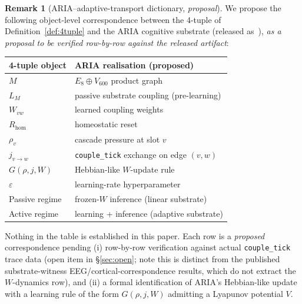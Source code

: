\documentclass[11pt]{article}
\theoremstyle{definition}
\newtheorem{remark}[theorem]{Remark}
\begin{document}
\begin{remark}[ARIA--adaptive-transport dictionary, \emph{proposal}]\label{rem:aria}
We propose the following object-level correspondence between the 4-tuple of Definition~\ref{def:4tuple} and the ARIA cognitive substrate (released as~\citep{SmartARIAChess2026}), \emph{as a proposal to be verified row-by-row against the released artifact}:
\begin{center}
\begin{tabular}{@{}ll@{}}
\toprule
4-tuple object & ARIA realisation (proposed) \\
\midrule
$M$ & $E_8 \oplus V_{600}$ product graph \\
$L_M$ & passive substrate coupling (pre-learning) \\
$W_{vw}$ & learned coupling weights \\
$R_{\mathrm{hom}}$ & homeostatic reset \\
$\rho_v$ & cascade pressure at slot $v$ \\
$j_{v \to w}$ & \texttt{couple\_tick} exchange on edge $(v, w)$ \\
$G(\rho, j, W)$ & Hebbian-like $W$-update rule \\
$\varepsilon$ & learning-rate hyperparameter \\
Passive regime & frozen-$W$ inference (linear substrate) \\
Active regime & learning + inference (adaptive substrate) \\
\bottomrule
\end{tabular}
\end{center}
Nothing in the table is established in this paper. Each row is a \emph{proposed} correspondence pending (i) row-by-row verification against actual \texttt{couple\_tick} trace data (open item in \S\ref{sec:open}; note this is distinct from the published substrate-witness EEG/cortical-correspondence results, which do not extract the $W$-dynamics row), and (ii) a formal identification of ARIA's Hebbian-like update with a learning rule of the form $G(\rho, j, W)$ admitting a Lyapunov potential $V$.
\end{remark}
\end{document}
